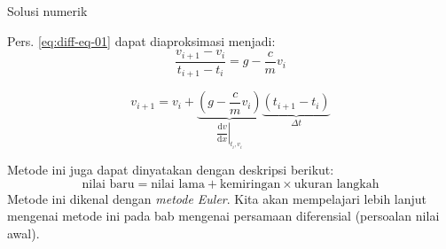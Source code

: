 \begin{frame}{Solusi numerik}

\fontsize{9pt}{10pt}\selectfont

Pers. \eqref{eq:diff-eq-01} dapat
diaproksimasi menjadi:
\begin{equation*}
\frac{v_{i+1} - v_{i}}{t_{i+1} - t_{i}} = g - \frac{c}{m} v_{i}
\end{equation*}

\begin{equation*}
v_{i+1} = v_{i} + \underbrace{\left( g - \frac{c}{m} v_{i} \right)}_{
  \left.\dfrac{\mathrm{d}v}{\mathrm{d}x}\right|_{t_{i},v_{i}}
}
\underbrace{\left( t_{i+1} - t_{i} \right)}_{\Delta t}
\end{equation*}

Metode ini juga dapat dinyatakan dengan deskripsi berikut:
\begin{equation*}
\text{nilai baru} = \text{nilai lama} + \text{kemiringan}\times\text{ukuran langkah}
\end{equation*}
Metode ini dikenal dengan \emph{metode Euler}. Kita akan mempelajari
lebih lanjut mengenai metode ini pada bab mengenai persamaan diferensial
(persoalan nilai awal).
\end{frame}



